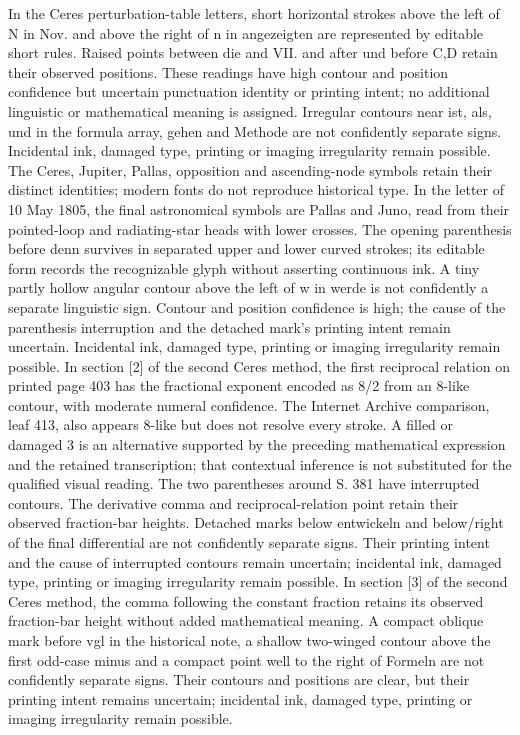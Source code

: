  In the Ceres perturbation-table letters, short horizontal strokes above the left of N in Nov. and above the right of n in angezeigten are represented by editable short rules. Raised points between die and VII. and after und before C,D retain their observed positions. These readings have high contour and position confidence but uncertain punctuation identity or printing intent; no additional linguistic or mathematical meaning is assigned. Irregular contours near ist, als, und in the formula array, gehen and Methode are not confidently separate signs. Incidental ink, damaged type, printing or imaging irregularity remain possible. The Ceres, Jupiter, Pallas, opposition and ascending-node symbols retain their distinct identities; modern fonts do not reproduce historical type.
 In the letter of 10 May 1805, the final astronomical symbols are Pallas and Juno, read from their pointed-loop and radiating-star heads with lower crosses. The opening parenthesis before denn survives in separated upper and lower curved strokes; its editable form records the recognizable glyph without asserting continuous ink. A tiny partly hollow angular contour above the left of w in werde is not confidently a separate linguistic sign. Contour and position confidence is high; the cause of the parenthesis interruption and the detached mark's printing intent remain uncertain. Incidental ink, damaged type, printing or imaging irregularity remain possible.
 In section [2] of the second Ceres method, the first reciprocal relation on printed page 403 has the fractional exponent encoded as 8/2 from an 8-like contour, with moderate numeral confidence. The Internet Archive comparison, leaf 413, also appears 8-like but does not resolve every stroke. A filled or damaged 3 is an alternative supported by the preceding mathematical expression and the retained transcription; that contextual inference is not substituted for the qualified visual reading. The two parentheses around S. 381 have interrupted contours. The derivative comma and reciprocal-relation point retain their observed fraction-bar heights. Detached marks below entwickeln and below/right of the final differential are not confidently separate signs. Their printing intent and the cause of interrupted contours remain uncertain; incidental ink, damaged type, printing or imaging irregularity remain possible.
 In section [3] of the second Ceres method, the comma following the constant fraction retains its observed fraction-bar height without added mathematical meaning. A compact oblique mark before vgl in the historical note, a shallow two-winged contour above the first odd-case minus and a compact point well to the right of Formeln are not confidently separate signs. Their contours and positions are clear, but their printing intent remains uncertain; incidental ink, damaged type, printing or imaging irregularity remain possible.

